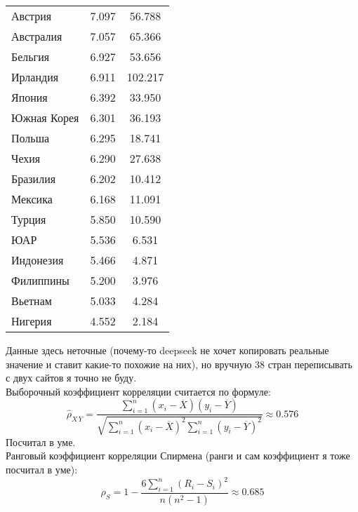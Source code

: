 \documentclass[12pt, a4paper]{article}
\begin{document}
\begin{longtable}{|l|c|c|}
  Австрия & 7.097 & 56.788 \\
  Австралия & 7.057 & 65.366 \\
  Бельгия & 6.927 & 53.656 \\
  Ирландия & 6.911 & 102.217 \\
  Япония & 6.392 & 33.950 \\
  Южная Корея & 6.301 & 36.193 \\
  Польша & 6.295 & 18.741 \\
  Чехия & 6.290 & 27.638 \\
  Бразилия & 6.202 & 10.412 \\
  Мексика & 6.168 & 11.091 \\
  Турция & 5.850 & 10.590 \\
  ЮАР & 5.536 & 6.531 \\
  Индонезия & 5.466 & 4.871 \\
  Филиппины & 5.200 & 3.976 \\
  Вьетнам & 5.033 & 4.284 \\
  Нигерия & 4.552 & 2.184 \\
  \hline
\end{longtable}
Данные здесь неточные (почему-то deepseek не хочет копировать реальные значение и ставит какие-то похожие на них), но вручную 38 стран переписывать с двух сайтов я точно не буду.\\
Выборочный коэффициент корреляции считается по формуле:
\[\hat \rho_{X\, Y} = \frac{\sum\limits_{i = 1}^{n} {\left( x_i - \overline{X} \right) \left( y_i - \overline{Y} \right)}}{ \sqrt{\sum\limits_{i = 1}^{n} {\left( x_i - \overline{X} \right)}^2 \sum\limits_{i = 1}^{n}{\left( y_i - \overline{Y} \right)}^2} } \approx 0.576\]
Посчитал в уме.\\
Ранговый коэффициент корреляции Спирмена (ранги и сам коэффициент я тоже посчитал в уме):
\[\rho_S = 1 - \frac{6 \sum\limits_{i = 1}^{n} {\left( R_i - S_i \right)}^2 }{n(n^2 - 1)} \approx 0.685\]
\end{document}
